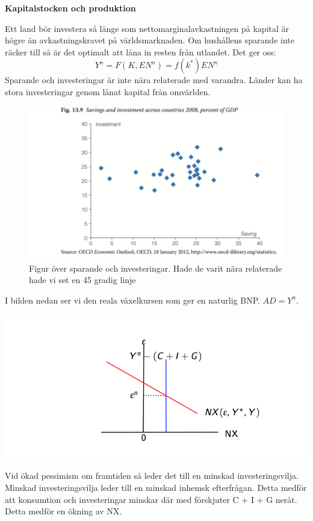 \documentclass{article}
\begin{document}
\textbf{Kapitalstocken och produktion}
\vspace{5mm} \par \noindent 

Ett land bör investera så länge som nettomarginalavkastningen på kapital är högre än avkastningskravet på världsmarknaden. Om hushållens sparande inte räcker till så är det optimalt att låna in resten från utlandet. Det ger oss: 
$$
Y^n = F(K,EN^n) = f(k^*)EN^n
$$
Sparande och investeringar är inte nära relaterade med varandra. Länder kan ha stora investeringar genom lånat kapital från omvärlden. 

\begin{figure}
    \centering
    \includegraphics[scale=0.5]{skarm13}
    \caption{Figur över sparande och investeringar. Hade de varit nära relaterade hade vi set en 45 gradig linje}
    \label{fig:1 }
\end{figure}

I bilden nedan ser vi den reala växelkursen som ger en naturlig BNP. $ AD = Y^n$. 


 \includegraphics[scale=0.7]{skarm14}
 
Vid ökad pessimism om framtiden så leder det till en minskad investeringsvilja. Minskad investeringsvilja leder till en minskad inhemsk efterfrågan. Detta medför att konsumtion och investeringar minskar där med förskjuter C + I + G neråt. Detta medför en ökning av NX. 
\end{document}
